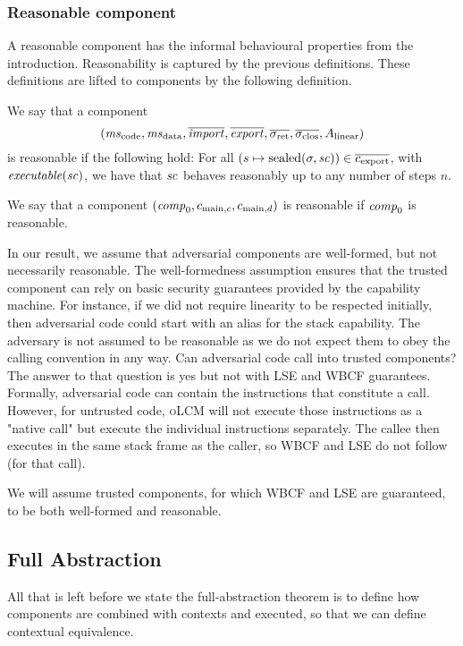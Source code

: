 \documentclass[acmsmall,screen]{acmart}\settopmatter{}
\newcommand{\srccm}{\textsc{oLCM}}
\newenvironment{jversion}%
    {\color{OliveGreen}}{}
\begin{document}
\begin{jversion}
  \subsubsection{Reasonable component}
  A reasonable component has the informal behavioural properties from the introduction.
  Reasonability is captured by the previous definitions. These definitions are lifted to components by the following definition.
  \begin{definition}
    \label{def:reasonable-component}
    We say that a component
    \[
      (\mscode,\msdata,\overline{\var{import}},\overline{\var{export}},\sigrets,\sigcloss,A_\linear)
    \]
    is reasonable if the following hold: For all $(s \mapsto \mathrm{sealed}(\sigma,\mathit{sc})) \in
    \overline{c_{\mathrm{export}}}$, with $\exec{\vsc}$, we have that $\mathit{sc}$
    behaves reasonably up to any number of steps $n$.

    We say that a component
    $(\mathit{comp}_0,c_{\mathrm{main},c}, c_{\mathrm{main},d})$ is reasonable if $\mathit{comp}_0$ is reasonable.
  \end{definition}
\end{jversion}

In our result, we assume that adversarial components are well-formed, but not necessarily reasonable. The well-formedness assumption ensures
 that the trusted component can rely on basic security guarantees provided by the capability machine. For instance, if we did not require linearity to be respected initially, then adversarial code could start with an alias for the stack capability. The adversary is not assumed to be reasonable as we do not expect them to obey the calling convention in any way. Can adversarial code call into trusted components? The answer to that question is yes but not with LSE and WBCF guarantees. Formally, adversarial code can contain the instructions that constitute a call. However, for untrusted code, \srccm{} will not execute those instructions as a "native call" but execute the individual instructions separately. The callee then executes in the same stack frame as the caller, so WBCF and LSE do not follow (for that call).

We will assume trusted components, for which WBCF and LSE are guaranteed, to be both well-formed and reasonable. 

\subsection{Full Abstraction}
All that is left before we state the full-abstraction theorem is to define how components are combined with contexts and executed, so that we can define contextual equivalence.
\end{document}
